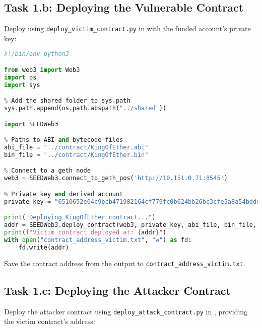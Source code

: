 \subsection{Task 1.b: Deploying the Vulnerable Contract}

Deploy using \texttt{deploy\_victim\_contract.py} in  with the funded account’s private key:

\begin{lstlisting}[language=python, caption={Deploying the contract (\texttt{deploy\_victim\_contract.py})}]
#!/bin/env python3

from web3 import Web3
import os
import sys

% Add the shared folder to sys.path
sys.path.append(os.path.abspath("../shared"))

import SEEDWeb3

% Paths to ABI and bytecode files
abi_file = "../contract/KingOfEther.abi"
bin_file = "../contract/KingOfEther.bin"

% Connect to a geth node
web3 = SEEDWeb3.connect_to_geth_pos('http://10.151.0.71:8545')

% Private key and derived account
private_key = "6510652e04c9bcb471982164cf779fc0b624bb26bc3cfe5a8a54bddeba90d667"

print("Deploying KingOfEther contract...")
addr = SEEDWeb3.deploy_contract(web3, private_key, abi_file, bin_file, None)
print(f"Victim contract deployed at: {addr}")
with open("contract_address_victim.txt", "w") as fd:
    fd.write(addr)
\end{lstlisting}

Save the contract address from the output to \texttt{contract\_address\_victim.txt}.

\subsection{Task 1.c: Deploying the Attacker Contract}

Deploy the attacker contract using \texttt{deploy\_attack\_contract.py} in , providing the victim contract’s address:

